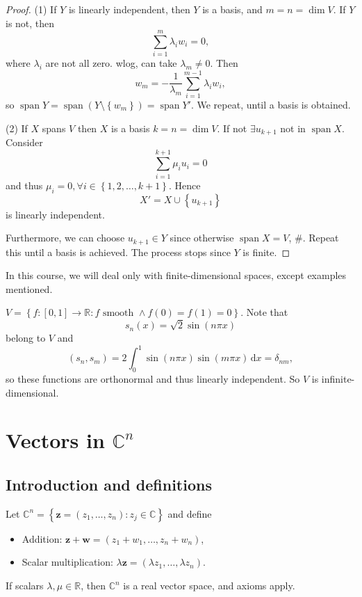\documentclass[10pt]{article}
\DeclareMathOperator{\spn}{span}
\begin{document}
    \begin{proof}
        (1) If $Y$ is linearly independent, then $Y$ is a basis, and $m=n=\dim V$. If $Y$ is not, then 
        \[
            \sum_{i=1}^{m}\lambda_i w_i=0
        ,\]
        where $ \lambda_i $ are not all zero. wlog, can take $\lambda_m\neq 0.$ Then 
        \[
            w_m=-\frac{1}{\lambda_m}\sum_{i=1}^{m-1}\lambda_i w_i
        ,\]
        so $ \spn Y=\spn (Y\setminus \left\{ w_m\right\})=\spn Y' $. We repeat, until a basis is obtained.

        (2) If $X$ spans $V$ then $X$ is a basis $k=n=\dim V$. If not $ \exists u_{k+1} $ not in $\spn X$. Consider 
        \[
            \sum_{i=1}^{k+1}\mu_i u_i=0
        \]
        and thus $\mu_{i}=0, \forall i\in \left\{ 1,2,\dots,k+1\right\}$. Hence 
        \[
            X'=X \cup \left\{ u_{k+1}\right\}
        \]
        is linearly independent.

        Furthermore, we can choose $u_{k+1}\in Y$ since otherwise $ \spn X=V $, \#. Repeat this until a basis is achieved. The process stops since $Y$ is finite.
    \end{proof}
    In this course, we will deal only with finite-dimensional spaces, except examples mentioned.
    \begin{example}
        $ V=\left\{ f:[0,1] \to \mathbb{R} : f\text{ smooth } \land f(0)=f(1)=0\right\} $. Note that 
        \[s_n(x)=\sqrt{2}\sin(n\pi x)\]
        belong to $V$ and 
        \[
            (s_n,s_m)=2 \int_{0}^{1} \sin(n\pi x)\sin(m\pi x) \,\mathrm{d}x=\delta_{nm},
        \]
        so these functions are orthonormal and thus linearly independent. So $V$ is infinite-dimensional.
    \end{example}
    \section{Vectors in $\mathbb{C}^n$}
    \subsection{Introduction and definitions}
    Let $ \mathbb{C}^n=\left\{ \mathbf{z}=(z_1,\dots,z_n):z_j\in \mathbb{C}\right\} $ and define 
    \begin{itemize}
        \item Addition: $ \mathbf{z}+\mathbf{w}=(z_1+w_1,\dots,z_n+w_n) $,
        \item Scalar multiplication: $ \lambda \mathbf{z}=(\lambda z_1,\dots, \lambda z_n) $.
    \end{itemize}
    If scalars $ \lambda,\mu\in \mathbb{R} $, then $ \mathbb{C}^n $ is a real vector space, and axioms apply.
\end{document}
